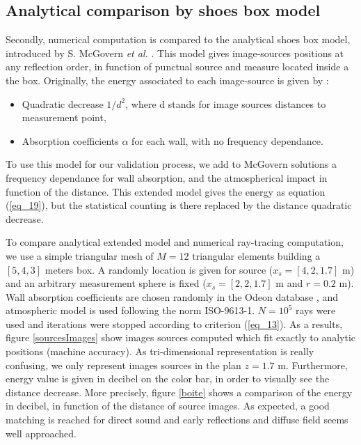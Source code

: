 \documentclass[AMA,STIX1COL]{WileyNJD-v2}
\begin{document}
\subsection{Analytical comparison by shoes box model}
Secondly, numerical computation is compared to the analytical shoes box model, introduced by S. McGovern \textit{et al.} \cite{mcgovern}. This model gives image-sources positions at any reflection order, in function of punctual source and measure located inside a the box. Originally, the energy associated to each image-source is given by :
\begin{itemize}
\item Quadratic decrease $1/d^2$, where d stands for image sources distances to measurement point,  
\item Absorption coefficients $\alpha$ for each wall, with no frequency dependance.
\end{itemize}
To use this model for our validation process, we add to McGovern solutions a frequency dependance for wall absorption, and the atmospherical impact in function of the distance. This extended model gives the energy as equation (\ref{eq_19}), but the statistical counting is there replaced by the distance quadratic decrease.

To compare analytical extended model and numerical ray-tracing computation, we use a simple triangular mesh of $M=12$ triangular elements building a $[5,4,3]$ meters box. A randomly location is given for source ($x_s = [4,2,1.7]$ m) and an arbitrary measurement sphere is fixed ($x_s = [2,2,1.7]$ m and $r=0.2$ m). Wall absorption coefficients are chosen randomly in the Odeon database \cite{odeon}, and atmospheric model is used following the norm ISO-9613-1\cite{iso}. $N = 10^ 5$ rays were used and iterations were stopped according to criterion (\ref{eq_13}). As a results, figure \ref{sourcesImages} show images sources computed which fit exactly to analytic positions (machine accuracy). As tri-dimensional representation is really confusing, we only represent images sources in the plan $z = 1.7$ m. Furthermore, energy value is given in decibel on the color bar, in order to visually see the distance decrease. More precisely, figure \ref{boite} shows a comparison of the energy in decibel, in function of the distance of source images. As expected, a good matching is reached for direct sound and early reflections and diffuse field seems well approached. 
 
\end{document}
